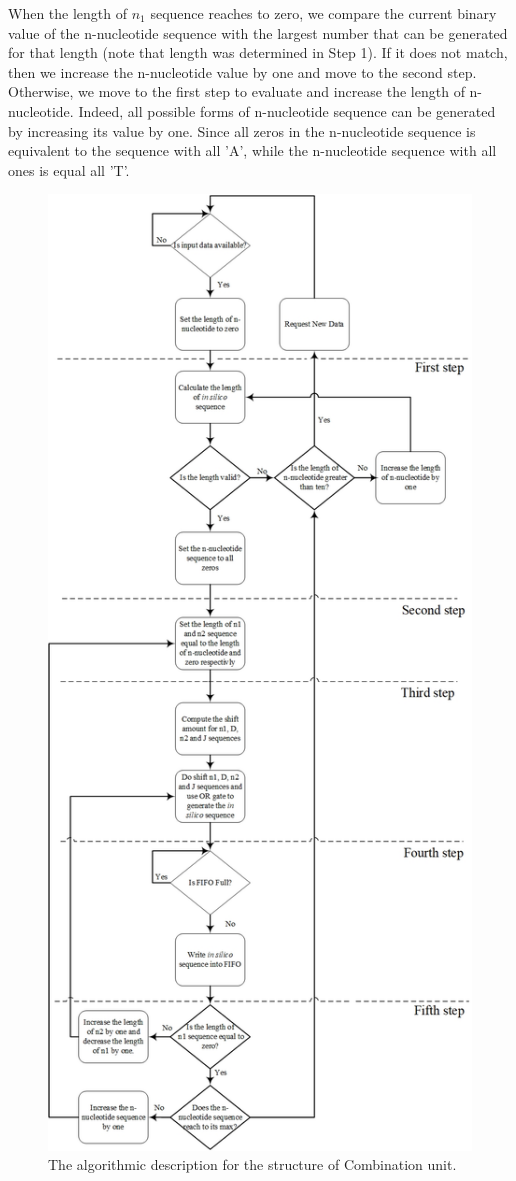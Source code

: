 When the length of $n_1$ sequence reaches to zero, we compare the current binary value of the n-nucleotide sequence with the largest number that can be generated for that length (note that length was determined in Step 1). If it does not match, then we increase the n-nucleotide value by one and move to the second step. Otherwise, we move to the first step to evaluate and increase the length of n-nucleotide. Indeed, all possible forms of n-nucleotide sequence can be generated by increasing its value by one. Since all zeros in the n-nucleotide sequence is equivalent to the sequence with all 'A', while the n-nucleotide sequence with all ones is equal all 'T'. 
\begin{figure}
\begin{center}
\includegraphics[clip,width=0.6\linewidth]{Fig/Combination_Unit.jpg}
\caption{The algorithmic description for the structure of Combination unit.}
\label{fig:CombinationUnit}
\end{center}
\end{figure}

